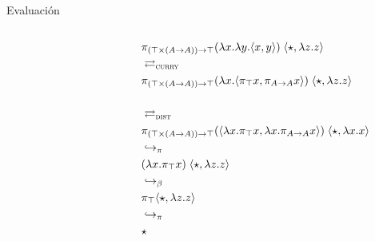 \begin{frame}{Evaluación}
	\begin{columns}
		\begin{column}{0.5\textwidth}
		\end{column}
		\begin{column}{0.5\textwidth}
			\fontsize{7}{8}\selectfont
			\vspace{4.5em}
			\begin{align*}
				&\pi_{(\top \times (A \rightarrow A) ) \rightarrow \top} (\lambda x. \lambda y. \langle x, y \rangle) \; \langle \star , \lambda z.z \rangle \\
				&\rightleftarrows_{\textsc{curry}} \\
				&\pi_{(\top \times (A \rightarrow A) ) \rightarrow \top} (\lambda x. \langle \pi_\top x , \pi_{A \rightarrow A} x \rangle) \; \langle \star , \lambda z.z \rangle \\
				\\
				&\rightleftarrows_{\textsc{dist}} \\
				&\pi_{(\top \times (A \rightarrow A) ) \rightarrow \top} (\langle \lambda x. \pi_\top x , \lambda x. \pi_{A \rightarrow A} x \rangle) \; \langle \star , \lambda x.x \rangle \\
				&\hookrightarrow_\pi \\
				&(\lambda x. \pi_\top x)\; \langle \star , \lambda z.z \rangle \\
				&\hookrightarrow_\beta \\
				&\pi_\top \langle \star , \lambda z.z \rangle \\
				&\hookrightarrow_\pi \\
				&\star
			\end{align*}
		\end{column}
	\end{columns}
\end{frame}
\fi